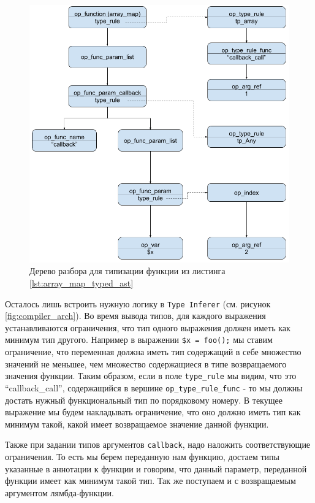 \begin{figure}[H]
    \caption{Дерево разбора для типизации функции из листинга \ref{lst:array_map_typed_ast}}
    \label{fig:ast_for_callback}
    \centering
    \includegraphics[width=\linewidth]{images/ast_for_callback}
\end{figure}

Осталось лишь встроить нужную логику в \verb|Type Inferer| (см. рисунок \ref{fig:compiler_arch}).
Во время вывода типов, для каждого выражения устанавливаются ограничения, что тип одного выражения должен иметь как минимум тип другого.
Например в выражении \verb|$x = foo();| мы ставим ограничение, что переменная должна иметь тип содержащий в себе множество значений не меньшее, чем множество содержащиеся в типе возвращаемого значения функции.
Таким образом, если в поле \verb|type_rule| мы видим, что это ``callback\_call'', содержащийся в вершине \verb|op_type_rule_func| - то мы должны достать нужный функциональный тип по порядковому номеру.
В текущее выражение мы будем накладывать ограничение, что оно должно иметь тип как минимум такой, какой имеет возвращаемое значение данной функции.

Также при задании типов аргументов \verb|callback|, надо наложить соответствующие ограничения.
То есть мы берем переданную нам функцию, достаем типы указанные в аннотации к функции и говорим, что данный параметр, переданной функции имеет как минимум такой тип.
Так же поступаем и с возвращаемым аргументом лямбда-функции.

